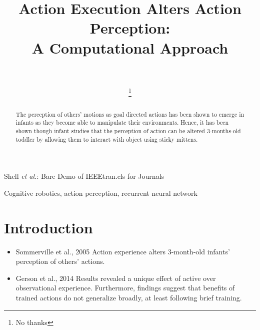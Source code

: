 \documentclass[journal]{IEEEtran}
\begin{document}
\title{Action Execution Alters Action Perception:\\ A Computational Approach}

\author{\\

\thanks{No thanks}}

%
{Shell \MakeLowercase{\textit{et al.}}: Bare Demo of IEEEtran.cls for Journals}

\maketitle

\begin{abstract}
The perception of others' motions as goal directed actions has been shown to emerge in infants as they become able to manipulate their environments. Hence, it has been shown though infant studies that the perception of action can be altered 3-months-old toddler by allowing them to interact with object using sticky mittens.  

\end{abstract}

\begin{IEEEkeywords}
Cognitive robotics, action perception, recurrent neural network
\end{IEEEkeywords}


\section{Introduction}

\begin{itemize}
\item Sommerville et al., 2005 \cite{Sommerville2005} Action experience alters 3-month-old infants' perception of others' actions.
\item Gerson et al., 2014 \cite{gerson2014learning} Results revealed a unique effect of active over observational experience. Furthermore, findings suggest that benefits of trained actions do not generalize broadly, at least following brief training.
\end{itemize}
\end{document}

